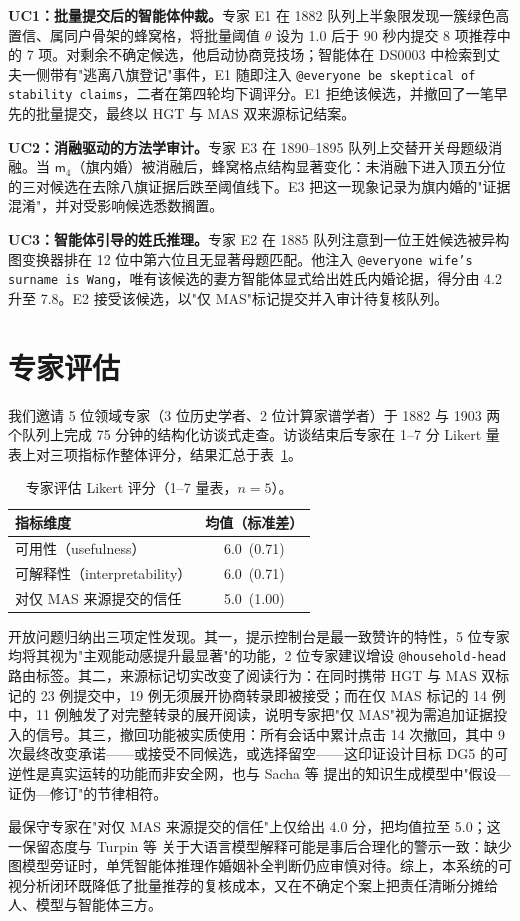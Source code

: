 \textbf{UC1：批量提交后的智能体仲裁。}专家 E1 在 1882 队列上半象限发现一簇绿色高置信、属同户骨架的蜂窝格，将批量阈值 \(\theta\) 设为 1.0 后于 90 秒内提交 8 项推荐中的 7 项。对剩余不确定候选，他启动协商竞技场；智能体在 DS0003 中检索到丈夫一侧带有"逃离八旗登记"事件，E1 随即注入 \texttt{@everyone be skeptical of stability claims}，二者在第四轮均下调评分。E1 拒绝该候选，并撤回了一笔早先的批量提交，最终以 HGT 与 MAS 双来源标记结案。

\textbf{UC2：消融驱动的方法学审计。}专家 E3 在 1890–1895 队列上交替开关母题级消融。当 \(\mathsf{m}_4\)（旗内婚）被消融后，蜂窝格点结构显著变化：未消融下进入顶五分位的三对候选在去除八旗证据后跌至阈值线下。E3 把这一现象记录为旗内婚的"证据混淆"，并对受影响候选悉数搁置。

\textbf{UC3：智能体引导的姓氏推理。}专家 E2 在 1885 队列注意到一位王姓候选被异构图变换器排在 12 位中第六位且无显著母题匹配。他注入 \texttt{@everyone wife's surname is Wang}，唯有该候选的妻方智能体显式给出姓氏内婚论据，得分由 4.2 升至 7.8。E2 接受该候选，以"仅 MAS"标记提交并入审计待复核队列。

\section{专家评估}\label{sec:case-expert}

我们邀请 5 位领域专家（3 位历史学者、2 位计算家谱学者）于 1882 与 1903 两个队列上完成 75 分钟的结构化访谈式走查。访谈结束后专家在 1–7 分 Likert 量表上对三项指标作整体评分，结果汇总于表~\ref{tab:expert-likert}。

\begin{table}[h]
  \centering
  \caption{专家评估 Likert 评分（1--7 量表，$n=5$）。}
  \label{tab:expert-likert}
  \begin{tabular}{lc}
    \toprule
    指标维度 & 均值（标准差）\\
    \midrule
    可用性（usefulness） & 6.0~(0.71) \\
    可解释性（interpretability） & 6.0~(0.71) \\
    对仅 MAS 来源提交的信任 & 5.0~(1.00) \\
    \bottomrule
  \end{tabular}
\end{table}

开放问题归纳出三项定性发现。其一，提示控制台是最一致赞许的特性，5 位专家均将其视为"主观能动感提升最显著"的功能，2 位专家建议增设 \texttt{@household-head} 路由标签。其二，来源标记切实改变了阅读行为：在同时携带 HGT 与 MAS 双标记的 23 例提交中，19 例无须展开协商转录即被接受；而在仅 MAS 标记的 14 例中，11 例触发了对完整转录的展开阅读，说明专家把"仅 MAS"视为需追加证据投入的信号。其三，撤回功能被实质使用：所有会话中累计点击 14 次撤回，其中 9 次最终改变承诺——或接受不同候选，或选择留空——这印证设计目标 DG5 的可逆性是真实运转的功能而非安全网，也与 Sacha 等\citep{sacha2014knowledge} 提出的知识生成模型中"假设—证伪—修订"的节律相符。

最保守专家在"对仅 MAS 来源提交的信任"上仅给出 4.0 分，把均值拉至 5.0；这一保留态度与 Turpin 等\citep{turpin2023faithfulness} 关于大语言模型解释可能是事后合理化的警示一致：缺少图模型旁证时，单凭智能体推理作婚姻补全判断仍应审慎对待。综上，本系统的可视分析闭环既降低了批量推荐的复核成本，又在不确定个案上把责任清晰分摊给人、模型与智能体三方。
